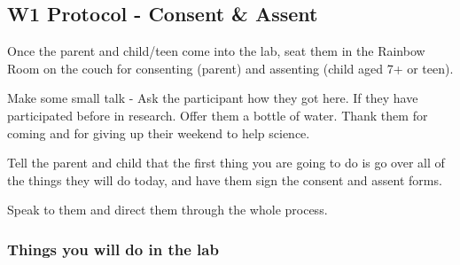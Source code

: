 \documentclass[]{book}
\begin{document}
\hypertarget{w1-protocol---consent-assent}{%
\subsection{W1 Protocol - Consent \& Assent}\label{w1-protocol---consent-assent}}

Once the parent and child/teen come into the lab, seat them in the Rainbow Room on the couch for consenting (parent) and assenting (child aged 7+ or teen).

Make some small talk - Ask the participant how they got here. If they have participated before in research. Offer them a bottle of water. Thank them for coming and for giving up their weekend to help science.

Tell the parent and child that the first thing you are going to do is go over all of the things they will do today, and have them sign the consent and assent forms.

Speak to them and direct them through the whole process.

\hypertarget{things-you-will-do-in-the-lab}{%
\subsubsection{Things you will do in the lab}\label{things-you-will-do-in-the-lab}}
\end{document}
